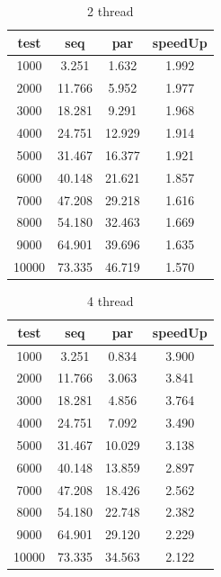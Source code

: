 \documentclass[11pt]{article}
\begin{document}
    \begin{table}
        \begin{tabular}{|c|c|c|c|}
            \hline
            test & seq & par & speedUp \\
            \hline
            1000 & 3.251 & 1.632 & 1.992 \\
            2000 & 11.766 & 5.952 & 1.977 \\
            3000 & 18.281 & 9.291 & 1.968 \\
            4000 & 24.751 & 12.929 & 1.914 \\
            5000 & 31.467 & 16.377 & 1.921 \\
            6000 & 40.148 & 21.621 & 1.857 \\
            7000 & 47.208 & 29.218 & 1.616 \\
            8000 & 54.180 & 32.463 & 1.669 \\
            9000 & 64.901 & 39.696 & 1.635 \\
            10000 & 73.335 & 46.719 & 1.570 \\
            \hline
        \end{tabular}
        \caption{2 thread}
    \end{table}

    \begin{table}
        \begin{tabular}{|c|c|c|c|}
            \hline
            test & seq & par & speedUp \\
            \hline
            1000 & 3.251 & 0.834 & 3.900 \\
            2000 & 11.766 & 3.063 & 3.841 \\
            3000 & 18.281 & 4.856 & 3.764 \\
            4000 & 24.751 & 7.092 & 3.490 \\
            5000 & 31.467 & 10.029 & 3.138 \\
            6000 & 40.148 & 13.859 & 2.897 \\
            7000 & 47.208 & 18.426 & 2.562 \\
            8000 & 54.180 & 22.748 & 2.382 \\
            9000 & 64.901 & 29.120 & 2.229 \\
            10000 & 73.335 & 34.563 & 2.122 \\
            \hline
        \end{tabular}
        \caption{4 thread}
    \end{table}
\end{document}
